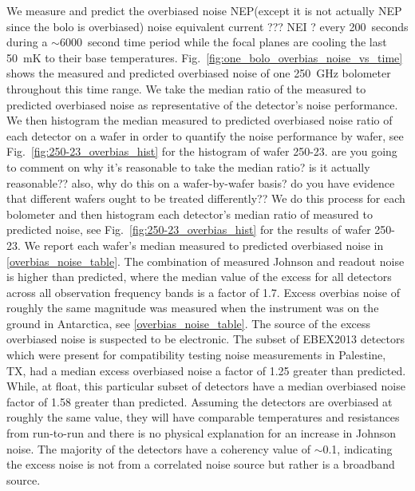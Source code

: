 We measure and predict the overbiased noise
\ac{NEP}(except it is not actually NEP since the bolo is overbiased) 
 noise equivalent current ??? \ac{NEI} ?
every 200~seconds during a $\sim$6000~second time period while the focal planes are cooling the last 50~mK to their base temperatures.
Fig.~\ref{fig:one_bolo_overbias_noise_vs_time} shows the measured and predicted overbiased noise of one 250~GHz bolometer throughout this time range.  
We take the median ratio of the measured to predicted overbiased noise as representative of the detector's noise performance.
We then histogram the median measured to predicted overbiased noise ratio of each detector on a wafer in order to quantify the noise performance by wafer, see Fig.~\ref{fig:250-23_overbias_hist} for the histogram of wafer 250-23. 
are you going to comment on why it's reasonable to take the median ratio? is it actually reasonable?? also, why do this on a wafer-by-wafer basis? do you have evidence that different wafers ought to be treated differently??
We do this process for each bolometer and then histogram each detector's median ratio of measured to predicted noise, see Fig.~\ref{fig:250-23_overbias_hist} for the results of wafer 250-23. 
We report each wafer's median measured to predicted overbiased noise in \TAB\ref{overbias_noise_table}. 
The combination of measured Johnson and readout noise is higher than predicted, where the median value of the excess for all detectors across all observation frequency bands is a factor of 1.7.  
Excess overbias noise of roughly the same magnitude was measured when the instrument was on the ground in Antarctica, see \TAB\ref{overbias_noise_table}. 
The source of the excess overbiased noise is suspected to be electronic. The subset of \ac{EBEX2013} detectors which were present for compatibility testing noise measurements in Palestine, TX, had a median excess overbiased noise a factor of 1.25 greater than predicted. While, at float, this particular subset of detectors have a median overbiased noise factor of 1.58 greater than predicted. Assuming the detectors are overbiased at roughly the same value, they will have comparable temperatures and resistances from run-to-run and there is no physical explanation for an increase in Johnson noise. 
The majority of the detectors have a coherency value of $\sim$0.1, indicating the excess noise is not from a correlated noise source but rather is a broadband source. 



